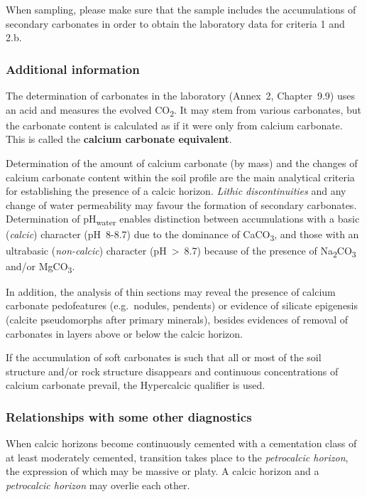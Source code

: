 \documentclass[
  letterpaper,
  DIV=11,
  numbers=noendperiod]{scrreprt}
\begin{document}
When sampling, please make sure that the sample includes the
accumulations of secondary carbonates in order to obtain the laboratory
data for criteria 1 and 2.b.

\hypertarget{additional-information-2}{%
\subsubsection{Additional information}\label{additional-information-2}}

The determination of carbonates in the laboratory (Annex~2, Chapter~9.9)
uses an acid and measures the evolved CO\textsubscript{2}. It may stem
from various carbonates, but the carbonate content is calculated as if
it were only from calcium carbonate. This is called the \textbf{calcium
carbonate equivalent}.

Determination of the amount of calcium carbonate (by mass) and the
changes of calcium carbonate content within the soil profile are the
main analytical criteria for establishing the presence of a calcic
horizon. \emph{Lithic discontinuities} and any change of water
permeability may favour the formation of secondary carbonates.
Determination of pH\textsubscript{water} enables distinction between
accumulations with a basic (\emph{calcic}) character (pH~8-8.7) due to
the dominance of CaCO\textsubscript{3}, and those with an ultrabasic
(\emph{non-calcic}) character (pH~\textgreater~8.7) because of the
presence of Na\textsubscript{2}CO\textsubscript{3} and/or
MgCO\textsubscript{3}.

In addition, the analysis of thin sections may reveal the presence of
calcium carbonate pedofeatures (e.g.~nodules, pendents) or evidence of
silicate epigenesis (calcite pseudomorphs after primary minerals),
besides evidences of removal of carbonates in layers above or below the
calcic horizon.

If the accumulation of soft carbonates is such that all or most of the
soil structure and/or rock structure disappears and continuous
concentrations of calcium carbonate prevail, the Hypercalcic qualifier
is used.

\hypertarget{relationships-with-some-other-diagnostics-3}{%
\subsubsection{Relationships with some other
diagnostics}\label{relationships-with-some-other-diagnostics-3}}

When calcic horizons become continuously cemented with a cementation
class of at least moderately cemented, transition takes place to the
\emph{petrocalcic horizon}, the expression of which may be massive or
platy. A calcic horizon and a \emph{petrocalcic horizon} may overlie
each other.
\end{document}
